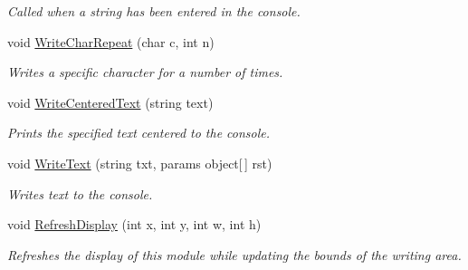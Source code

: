 \begin{DoxyCompactItemize}
\begin{DoxyCompactList}\small\item\em Called when a string has been entered in the console.\end{DoxyCompactList}\item 
void \hyperlink{class_m_b_c_1_1_app_1_1_terminal_1_1_terminal_module_a274184a9bc3b3c171db5dd530a3e19fc}{Write\-Char\-Repeat} (char c, int n)
\begin{DoxyCompactList}\small\item\em Writes a specific character for a number of times.\end{DoxyCompactList}\item 
void \hyperlink{class_m_b_c_1_1_app_1_1_terminal_1_1_terminal_module_a7ea2da056ffca96e99d3aeb357e1ef79}{Write\-Centered\-Text} (string text)
\begin{DoxyCompactList}\small\item\em Prints the specified text centered to the console.\end{DoxyCompactList}\item 
\hypertarget{class_m_b_c_1_1_app_1_1_terminal_1_1_terminal_module_a7b87bd371c50dc319dff8f131ad6b46a}{void \hyperlink{class_m_b_c_1_1_app_1_1_terminal_1_1_terminal_module_a7b87bd371c50dc319dff8f131ad6b46a}{Write\-Text} (string txt, params object\mbox{[}$\,$\mbox{]} rst)}\label{class_m_b_c_1_1_app_1_1_terminal_1_1_terminal_module_a7b87bd371c50dc319dff8f131ad6b46a}

\begin{DoxyCompactList}\small\item\em Writes text to the console.\end{DoxyCompactList}\item 
\hypertarget{class_m_b_c_1_1_app_1_1_terminal_1_1_terminal_module_aa829e4d4814df58eaa73d5b1be901132}{void \hyperlink{class_m_b_c_1_1_app_1_1_terminal_1_1_terminal_module_aa829e4d4814df58eaa73d5b1be901132}{Refresh\-Display} (int x, int y, int w, int h)}\label{class_m_b_c_1_1_app_1_1_terminal_1_1_terminal_module_aa829e4d4814df58eaa73d5b1be901132}

\begin{DoxyCompactList}\small\item\em Refreshes the display of this module while updating the bounds of the writing area.\end{DoxyCompactList}\end{DoxyCompactItemize}
